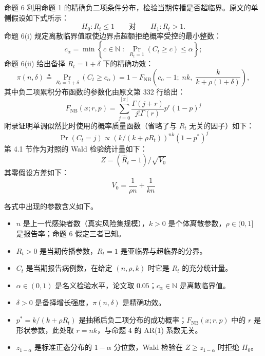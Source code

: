 命题 6 利用命题 1 的精确负二项条件分布，检验当期传播是否超临界。原文的单侧假设如下式所示：
\begin{equation*}
H_0: R_t \le 1 \qquad \text{对} \qquad H_1: R_t > 1.
\tag{原文式 23}
\end{equation*}
命题 6(i) 规定离散临界值取使边界点超额拒绝概率受控的最小整数：
\begin{equation*}
c_\alpha = \min \left\{ c \in \mathbb{N} \;:\; \Pr_{R_t = 1}(C_t \ge c) \le \alpha \right\};
\tag{原文式 24}
\end{equation*}
命题 6(ii) 给出备择 $R_t=1+\delta$ 下的精确功效：
\begin{equation*}
\pi(n, \delta) \triangleq \Pr_{R_t = 1 + \delta}(C_t \ge c_\alpha) = 1 - F_{\operatorname{NB}}\!\left(c_\alpha - 1; \; nk, \; \frac{k}{k + \rho(1+\delta)}\right),
\tag{原文式 25}
\end{equation*}
其中负二项累积分布函数的参数化由原文第 332 行给出：
\begin{equation*}
F_{\operatorname{NB}}(x; r, p) = \sum_{j=0}^{\lfloor x \rfloor} \frac{\Gamma(j+r)}{j!\Gamma(r)} p^r (1-p)^j
\tag*{原文第 332 行}
\end{equation*}
附录证明单调似然比时使用的概率质量函数（省略了与 $R_t$ 无关的因子）如下：
\begin{equation*}
\Pr(C_t = j) \propto (k/(k+\rho R_t))^{nk}(1-p^*)^j
\tag*{原文第 758 行}
\end{equation*}
第 4.1 节作为对照的 Wald 检验统计量如下：
\begin{equation*}
Z = (\widehat{R}_t - 1)/\sqrt{V_0}
\tag*{原文第 350 行}
\end{equation*}
其零假设方差如下：
\begin{equation*}
V_0 = \frac{1}{\rho n} + \frac{1}{kn}
\tag*{原文第 350 行}
\end{equation*}

各式中出现的参数含义如下。
\begin{itemize}
\item $n$ 是上一代感染者数（真实风险集规模），$k>0$ 是个体离散参数，$\rho\in(0,1]$ 是报告率；命题 6 假定三者已知。
\item $R_t>0$ 是当期传播参数，$R_t=1$ 是亚临界与超临界的分界。
\item $C_t$ 是当期报告病例数，在给定 $(n,\rho,k)$ 时它是 $R_t$ 的充分统计量。
\item $\alpha\in(0,1)$ 是名义检验水平，论文取 $0.05$；$c_\alpha\in\mathbb N$ 是离散临界值。
\item $\delta>0$ 是备择增长强度，$\pi(n,\delta)$ 是精确功效。
\item $p^*=k/(k+\rho R_t)$ 是抽稀后负二项分布的成功概率；$F_{\operatorname{NB}}(x;r,p)$ 中的 $r$ 是形状参数，此处取 $r=nk$，与命题 4 的 AR(1) 系数无关。
\item $z_{1-\alpha}$ 是标准正态分布的 $1-\alpha$ 分位数，Wald 检验在 $Z\ge z_{1-\alpha}$ 时拒绝 $H_0$。
\end{itemize}

